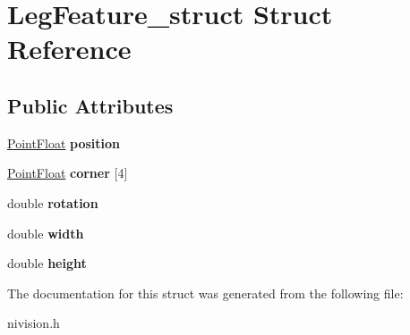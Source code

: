 \hypertarget{structLegFeature__struct}{
\section{LegFeature\_\-struct Struct Reference}
\label{structLegFeature__struct}
}
\subsection*{Public Attributes}
\begin{DoxyCompactItemize}
\item 
\hypertarget{structLegFeature__struct_a3544335599e5d902d294b44d79312063}{
\hyperlink{structPointFloat__struct}{PointFloat} {\bfseries position}}
\label{structLegFeature__struct_a3544335599e5d902d294b44d79312063}

\item 
\hypertarget{structLegFeature__struct_a9a1a02a3cd2bf219c7ab34a5861c9e48}{
\hyperlink{structPointFloat__struct}{PointFloat} {\bfseries corner} \mbox{[}4\mbox{]}}
\label{structLegFeature__struct_a9a1a02a3cd2bf219c7ab34a5861c9e48}

\item 
\hypertarget{structLegFeature__struct_a6019f8be66ba4bf09b17b58d057d07d9}{
double {\bfseries rotation}}
\label{structLegFeature__struct_a6019f8be66ba4bf09b17b58d057d07d9}

\item 
\hypertarget{structLegFeature__struct_a53e4389938a0cba95d01b683d6441bfd}{
double {\bfseries width}}
\label{structLegFeature__struct_a53e4389938a0cba95d01b683d6441bfd}

\item 
\hypertarget{structLegFeature__struct_a59ff7a95e2b828d1395a0a900f5c4085}{
double {\bfseries height}}
\label{structLegFeature__struct_a59ff7a95e2b828d1395a0a900f5c4085}

\end{DoxyCompactItemize}


The documentation for this struct was generated from the following file:\begin{DoxyCompactItemize}
\item 
nivision.h\end{DoxyCompactItemize}
